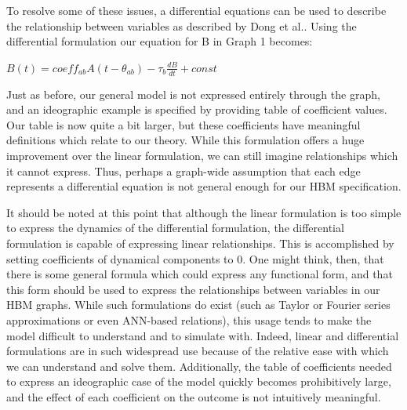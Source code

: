 \documentclass[runningheads,a4paper]{llncs}
\begin{document}
To resolve some of these issues, a differential equations can be used to describe the relationship between variables as described by Dong et al.\cite{dong2012dynamical}. 
Using the differential formulation our equation for B in Graph 1 becomes:

\begin{centering}
$B(t) = coeff_{ab}A(t-\theta_{ab}) - \tau_{b}\frac{dB}{dt} + const$\\
\end{centering}

Just as before, our general model is not expressed entirely through the graph, and an ideographic example is specified by providing table of coefficient values.
Our table is now quite a bit larger, but these coefficients have meaningful definitions which relate to our theory.
While this formulation offers a huge improvement over the linear formulation, we can still imagine relationships which it cannot express.
Thus, perhaps a graph-wide assumption that each edge represents a differential equation is not general enough for our HBM specification. 

It should be noted at this point that although the linear formulation is too simple to express the dynamics of the differential formulation, the differential formulation is capable of expressing linear relationships.
This is accomplished by setting coefficients of dynamical components to 0.
One might think, then, that there is some general formula which could express any functional form, and that this form should be used to express the relationships between variables in our HBM graphs.
While such formulations do exist (such as Taylor or Fourier series approximations or even ANN-based relations), this usage tends to make the model difficult to understand and to simulate with.
Indeed, linear and differential formulations are in such widespread use because of the relative ease with which we can understand and solve them. 
Additionally, the table of coefficients needed to express an ideographic case of the model quickly becomes prohibitively large, and the effect of each coefficient on the outcome is not intuitively meaningful.
\end{document}
